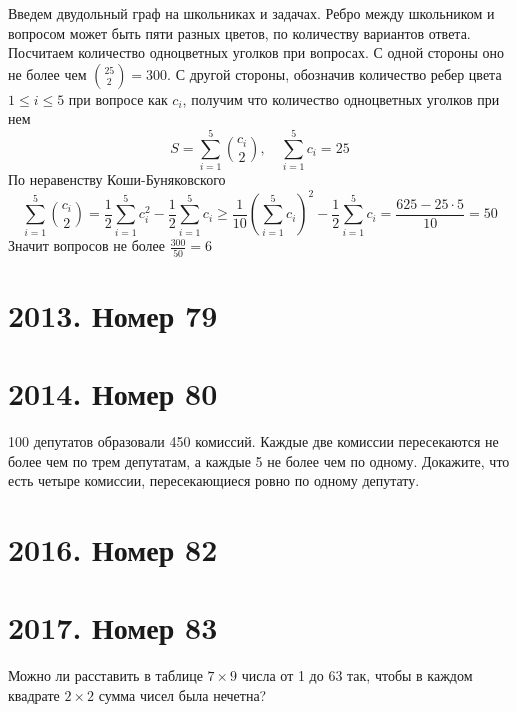 \documentclass[11pt, a4paper]{common/document_template}
\begin{document}
\begin{Solution}
Введем двудольный граф на школьниках и задачах. Ребро между школьником и вопросом может быть пяти разных цветов, по количеству вариантов ответа. Посчитаем количество одноцветных уголков при вопросах. С одной стороны оно не более чем $\binom{25}{2} = 300$. С другой стороны, обозначив количество ребер цвета $1 \leqslant i \leqslant 5$ при вопросе как $c_{i}$, получим что количество одноцветных уголков при нем
$$
S = \sum_{i = 1}^{5} \binom{c_{i}}{2}, \quad \sum_{i=1}^{5} c_{i} = 25
$$
По неравенству Коши-Буняковского
$$
\sum_{i = 1}^{5} \binom{c_{i}}{2} = \frac{1}{2} \sum_{i=1}^{5} c_{i}^{2} - \frac{1}{2} \sum_{i = 1}^{5} c_{i} \geqslant \frac{1}{10} \left( \sum_{i = 1}^{5} c_{i} \right)^{2} - \frac{1}{2} \sum_{i = 1}^{5} c_{i} = \frac{625 - 25 \cdot 5}{10} = 50
$$
Значит вопросов не более $\frac{300}{50} = 6$
\end{Solution}

\chapter{2013. Номер 79}



\chapter{2014. Номер 80}

\begin{exercise}
100 депутатов образовали 450 комиссий. Каждые две комиссии пересекаются не более чем по трем депутатам, а каждые 5 не более чем по одному. Докажите, что есть четыре комиссии, пересекающиеся ровно по одному депутату.
\end{exercise}

\chapter{2016. Номер 82}



\chapter{2017. Номер 83}

\begin{exercise}
Можно ли расставить в таблице $7 \times 9$ числа от 1 до 63 так, чтобы в каждом квадрате $2 \times 2$ сумма чисел была нечетна?
\end{exercise}
\end{document}
